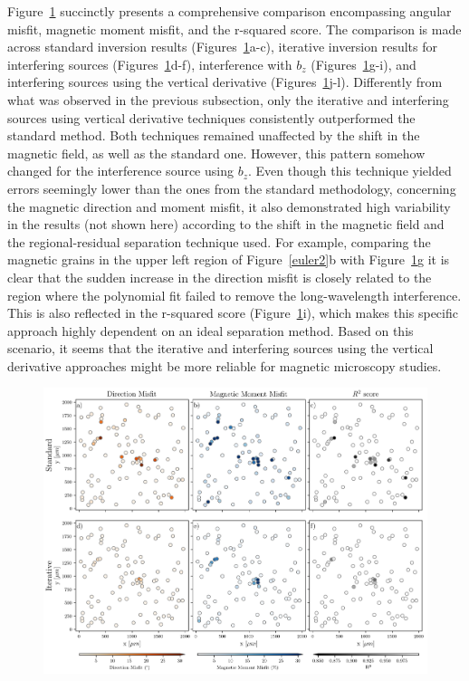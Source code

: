 Figure~\ref{inversion2} succinctly presents a comprehensive comparison encompassing angular misfit, magnetic moment misfit, and the r-squared score. The comparison is made across standard inversion results (Figures~\ref{inversion2}a-c), iterative inversion results for interfering sources (Figures~\ref{inversion2}d-f), interference with $b_z$ (Figures~\ref{inversion2}g-i), and interfering sources using the vertical derivative (Figures~\ref{inversion2}j-l). Differently from what was observed in the previous subsection, only the iterative and interfering sources using vertical derivative techniques consistently outperformed the standard method. Both techniques remained unaffected by the shift in the magnetic field, as well as the standard one. However, this pattern somehow changed for the interference source using $b_z$. Even though this technique yielded errors seemingly lower than the ones from the standard methodology, concerning the magnetic direction and moment misfit, it also demonstrated high variability in the results (not shown here) according to the shift in the magnetic field and the regional-residual separation technique used. For example, comparing the magnetic grains in the upper left region of Figure~\ref{euler2}b with Figure~\ref{inversion2}g it is clear that the sudden increase in the direction misfit is closely related to the region where the polynomial fit failed to remove the long-wavelength interference. This is also reflected in the r-squared score (Figure~\ref{inversion2}i), which makes this specific approach highly dependent on an ideal separation method. Based on this scenario, it seems that the iterative and interfering sources using the vertical derivative approaches might be more reliable for magnetic microscopy studies.

\begin{figure}[tb!]
  \centering
  \includegraphics[width=1\linewidth]{figures/inversion-comparion-2.png}
  \caption{
      }
  \label{inversion2}
\end{figure}
